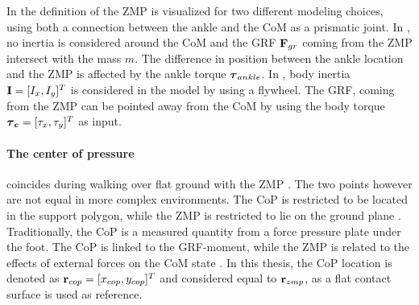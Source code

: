 In  the definition of the \ac{ZMP} is visualized for two different modeling choices, using both a connection between the ankle and the \ac{CoM} as a prismatic joint. In , no inertia is considered around the \ac{CoM} and the \ac{GRF} $\mathbf{F}_{gr}$ coming from the \ac{ZMP} intersect with the mass $m$. The difference in position between the ankle location and the \ac{ZMP} is affected by the ankle torque $\boldsymbol{\tau}_{ankle}$. In , body inertia $\mathbf{I} = [I_x, I_y]^T$ is considered in the model by using a flywheel. The \ac{GRF}, coming from the \ac{ZMP} can be pointed away from the \ac{CoM} by using the body torque $\boldsymbol{\tau}_{\mathbf{c}} = [\tau_x, \tau_y]^T$ as input. 

\paragraph{The center of pressure} coincides during walking over flat ground with the \ac{ZMP} \cite{vukobratovic2004zero}. The two points however are not equal in more complex environments. The \ac{CoP} is restricted to be located in the support polygon, while the \ac{ZMP} is restricted to lie on the ground plane  \cite{sardain2004forces}. Traditionally, the \ac{CoP} is a measured quantity from a force pressure plate under the foot. The \ac{CoP} is linked to the \ac{GRF}-moment, while the \ac{ZMP} is related to the effects of external forces on the \ac{CoM} state \cite{sardain2004forces}. In this thesis, the \ac{CoP} location is denoted as $\mathbf{r}_{cop} = [x_{cop}, y_{cop}]^T$ and considered equal to $\mathbf{r}_{zmp}$, as a flat contact surface is used as reference.


